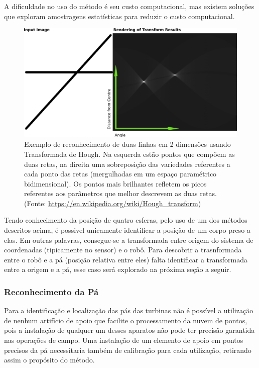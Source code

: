 A dificuldade no uso do método é seu custo computacional, mas existem soluções
que exploram amostragens estatísticas para reduzir o custo computacional.

\begin{figure}[h!]
   \centering
   \includegraphics[width=0.95\columnwidth]{detail/figs/localizacao/hough}
   \caption{Exemplo de reconhecimento de duas linhas em 2 dimensões usando
   Transformada de Hough. Na esquerda estão pontos que compõem as duas retas, na
   direita uma sobreposição das variedades referentes a cada ponto das retas
   (mergulhadas em um espaço paramétrico bidimensional). Os pontos mais
   brilhantes refletem os picos referentes aos parâmetros que melhor descrevem as duas retas. (Fonte: 
   \url{https://en.wikipedia.org/wiki/Hough_transform})}
   \label{fig::hough}
\end{figure}

Tendo conhecimento da posição de quatro esferas, pelo uso de um dos métodos
descritos acima, é possivel unicamente identificar a posição de um corpo preso a
elas. Em outras palavras, consegue-se a transformada entre origem do sistema de
coordenadas (tipicamente no sensor) e o robô. Para descobrir a trasnformada
entre o robô e a pá (posição relativa entre eles) falta identificar a
transformada entre a origem e a pá, esse caso será explorado na próxima seção a
seguir.

\subsubsection{Reconhecimento da Pá} 

Para a identificação e localização das pás das turbinas não é possível a
utilização de nenhum artifício de apoio que facilite o processamento da nuvem de
pontos, pois a instalação de qualquer um desses aparatos não pode ter precisão
garantida nas operações de campo. Uma instalação de um elemento de apoio em
pontos precisos da pá necessitaria também de calibração para cada utilização, retirando assim
o propósito do método. 

